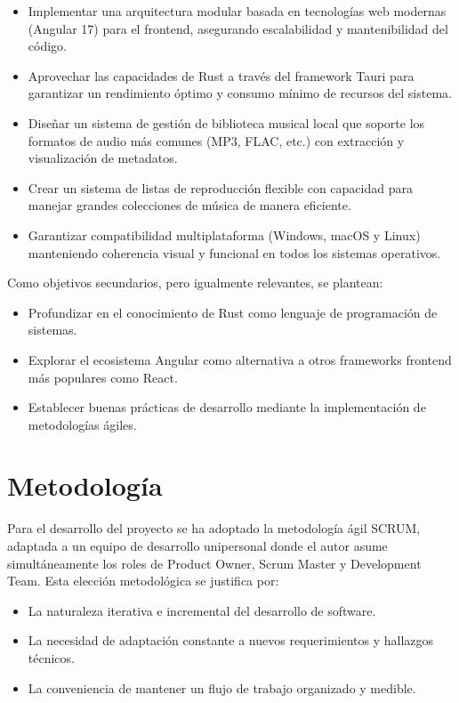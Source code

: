 \documentclass[11pt, a4paper]{article}
\begin{document}
\begin{itemize}
    \item Implementar una arquitectura modular basada en tecnologías web modernas (Angular 17) para el frontend, asegurando escalabilidad y mantenibilidad del código.
    \item Aprovechar las capacidades de Rust a través del framework Tauri para garantizar un rendimiento óptimo y consumo mínimo de recursos del sistema.
    \item Diseñar un sistema de gestión de biblioteca musical local que soporte los formatos de audio más comunes (MP3, FLAC, etc.) con extracción y visualización de metadatos.
    \item Crear un sistema de listas de reproducción flexible con capacidad para manejar grandes colecciones de música de manera eficiente.
    \item Garantizar compatibilidad multiplataforma (Windows, macOS y Linux) manteniendo coherencia visual y funcional en todos los sistemas operativos.
\end{itemize}

Como objetivos secundarios, pero igualmente relevantes, se plantean:
\begin{itemize}
    \item Profundizar en el conocimiento de Rust como lenguaje de programación de sistemas.
    \item Explorar el ecosistema Angular como alternativa a otros frameworks frontend más populares como React.
    \item Establecer buenas prácticas de desarrollo mediante la implementación de metodologías ágiles.
\end{itemize}


\section{Metodología}

Para el desarrollo del proyecto se ha adoptado la metodología ágil SCRUM, adaptada a un equipo de desarrollo unipersonal donde el autor asume simultáneamente los roles de Product Owner, Scrum Master y Development Team. Esta elección metodológica se justifica por:

\begin{itemize}
    \item La naturaleza iterativa e incremental del desarrollo de software.
    \item La necesidad de adaptación constante a nuevos requerimientos y hallazgos técnicos.
    \item La conveniencia de mantener un flujo de trabajo organizado y medible.
\end{itemize}
\end{document}
